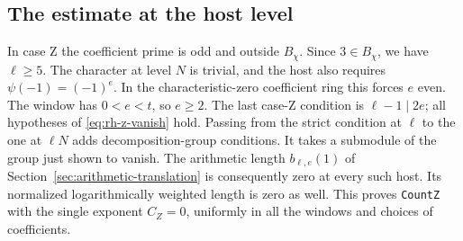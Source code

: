 \subsection{The estimate at the host level}

In case Z the coefficient prime is odd and outside \(B_\chi\).
Since \(3\in B_\chi\), we have \(\ell\ge5\). The character at level
\(N\) is trivial, and the host also requires
\(\psi(-1)=(-1)^e\). In the characteristic-zero coefficient ring this
forces \(e\) even. The window has \(0<e<t\), so \(e\ge2\).
The last case-Z condition is \(\ell-1\mid2e\); all hypotheses of
\eqref{eq:rh-z-vanish} hold. Passing from the strict condition at
\(\ell\) to the one at \(\ell N\) adds decomposition-group conditions.
It takes a submodule of the group just shown to vanish. The arithmetic
length \(b_{\ell,e}(1)\) of Section~\ref{sec:arithmetic-translation}
is consequently zero at every such host. Its normalized logarithmically
weighted length is zero as well. This proves \texttt{Count\allowbreak{}Z} with the
single exponent \(C_Z=0\), uniformly in all the windows and choices of
coefficients.
